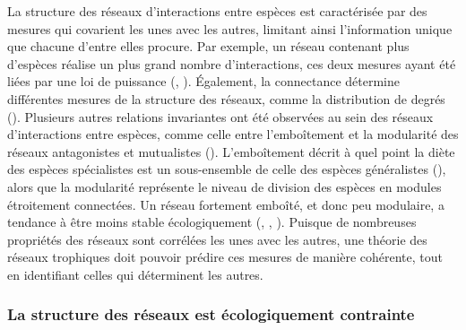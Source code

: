 La structure des réseaux d'interactions entre espèces est caractérisée par des
mesures qui covarient les unes avec les autres, limitant ainsi l'information
unique que chacune d'entre elles procure. Par exemple, un réseau contenant plus
d'espèces réalise un plus grand nombre d'interactions, ces deux mesures ayant
été liées par une loi de puissance (\cite{Brose2004Unified},
\cite{Riede2010Chapter}). Également, la connectance détermine différentes
mesures de la structure des réseaux, comme la distribution de degrés
(\cite{Poisot2014When}). Plusieurs autres relations invariantes ont été
observées au sein des réseaux d'interactions entre espèces, comme celle entre
l'emboîtement et la modularité des réseaux antagonistes et mutualistes
(\cite{Fortuna2010Nestedness}). L'emboîtement décrit à quel point la diète des
espèces spécialistes est un sous-ensemble de celle des espèces généralistes
(\cite{Staniczenko2013Ghost}), alors que la modularité représente le niveau de
division des espèces en modules étroitement connectées. Un réseau fortement
emboîté, et donc peu modulaire, a tendance à être moins stable écologiquement
(\cite{Okuyama2008Network}, \cite{Bastolla2009Architecture},
\cite{Thebault2010Stability}). Puisque de nombreuses propriétés des réseaux sont
corrélées les unes avec les autres, une théorie des réseaux trophiques doit
pouvoir prédire ces mesures de manière cohérente, tout en identifiant celles qui
déterminent les autres.

\subsubsection{La structure des réseaux est écologiquement contrainte} 


